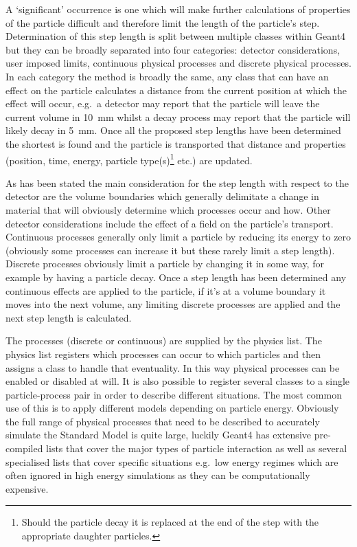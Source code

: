 A `significant' occurrence is one which will make further calculations of properties of the particle difficult and therefore limit the length of the particle's step. Determination of this step length is split between multiple classes within Geant4 but they can be broadly separated into four categories: detector considerations, user imposed limits, continuous physical processes and discrete physical processes. In each category the method is broadly the same, any class that can have an effect on the particle calculates a distance from the current position at which the effect will occur, e.g.\ a detector may report that the particle will leave the current volume in 10~mm whilst a decay process may report that the particle will likely decay in 5~mm. Once all the proposed step lengths have been determined the shortest is found and the particle is transported that distance and properties (position, time, energy, particle type(s)\footnote{Should the particle decay it is replaced at the end of the step with the appropriate daughter particles.} etc.) are updated. 

As has been stated the main consideration for the step length with respect to the detector are the volume boundaries which generally delimitate a change in material that will obviously determine which processes occur and how. Other detector considerations include the effect of a field on the particle's transport. Continuous processes generally only limit a particle by reducing its energy to zero (obviously some processes can increase it but these rarely limit a step length). Discrete processes obviously limit a particle by changing it in some way, for example by having a particle decay. Once a step length has been determined any continuous effects are applied to the particle, if it's at a volume boundary it moves into the next volume, any limiting discrete processes are applied and the next step length is calculated. 

The processes (discrete or continuous) are supplied by the physics list. The physics list registers which processes can occur to which particles and then assigns a class to handle that eventuality. In this way physical processes can be enabled or disabled at will. It is also possible to register several classes to a single particle-process pair in order to describe different situations. The most common use of this is to apply different models depending on particle energy. Obviously the full range of physical processes that need to be described to accurately simulate the Standard Model is quite large, luckily Geant4 has extensive pre-compiled lists that cover the major types of particle interaction as well as several specialised lists that cover specific situations e.g.\ low energy regimes which are often ignored in high energy simulations as they can be computationally expensive. 

